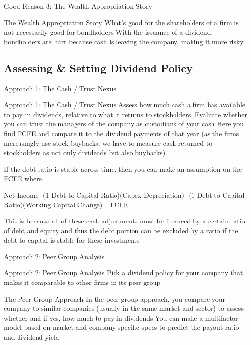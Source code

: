 \documentclass[10pt]{article}
\begin{document}
    \begin{core}{Good Reason 3: The Wealth Appropriation Story}

      The Wealth Appropriation Story
      What’s good for the shareholders of a firm is not necessarily good for bondholders
      With the issuance of a dividend, bondholders are hurt because cash is leaving the company, making it more risky

    \end{core}

  \subsection{Assessing \& Setting Dividend Policy}

    \begin{core}{Approach 1: The Cash / Trust Nexus}

      Approach 1: The Cash / Trust Nexus
      Assess how much cash a firm has available to pay in dividends, relative to what it returns to stockholders. Evaluate whether you can trust the managers of the company as custodians of your cash
      Here you find FCFE and compare it to the dividend payments of that year (as the firms increasingly use stock buybacks, we have to measure cash returned to stockholders as not only dividends but also buybacks) 

      If the debt ratio is stable across time, then you can make an assumption on the FCFE where

      Net Income
      -(1-Debt to Capital Ratio)(Capex-Depreciation)
      -(1-Debt to Capital Ratio)(Working Capital Change)
      =FCFE

      This is because all of these cash adjustments must be financed by a certain ratio of debt and equity and thus the debt portion can be excluded by a ratio if the debt to capital is stable for these investments

    \end{core}

    \begin{core}{Approach 2: Peer Group Analysis}

      Approach 2: Peer Group Analysis
      Pick a dividend policy for your company that makes it comparable to other firms in its peer group

      The Peer Group Approach
      In the peer group approach, you compare your company to similar companies (usually in the same market and sector) to assess whether and if yes, how much to pay in dividends
      You can make a multifactor model based on market and company specific specs to predict the payout ratio and dividend yield

    \end{core}
\end{document}

